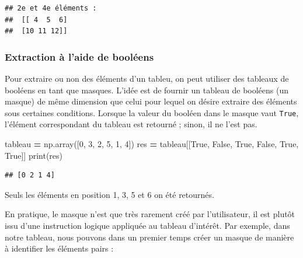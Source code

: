 \documentclass[12pt,]{book}
\newenvironment{Shaded}{\begin{snugshade}}{\end{snugshade}}
\newcommand{\DecValTok}[1]{\textcolor[rgb]{0.00,0.00,0.81}{#1}}
\newcommand{\VariableTok}[1]{\textcolor[rgb]{0.00,0.00,0.00}{#1}}
\newcommand{\OperatorTok}[1]{\textcolor[rgb]{0.81,0.36,0.00}{\textbf{#1}}}
\newcommand{\BuiltInTok}[1]{#1}
\newcommand{\NormalTok}[1]{#1}
\numberwithin{equation}{section}
\numberwithin{countremarque}{section}
\begin{document}
\begin{lstlisting}
## 2e et 4e éléments : 
##  [[ 4  5  6]
##  [10 11 12]]
\end{lstlisting}

\subsubsection{Extraction à l'aide de
booléens}\label{extraction-a-laide-de-booleens}

Pour extraire ou non des éléments d'un tableu, on peut utiliser des
tableaux de booléens en tant que masques. L'idée est de fournir un
tableau de booléens (un masque) de même dimension que celui pour lequel
on désire extraire des éléments sous certaines conditions. Lorsque la
valeur du booléen dans le masque vaut \texttt{True}, l'élément
correspondant du tableau est retourné ; sinon, il ne l'est pas.

\begin{Shaded}
\begin{Highlighting}[]
\NormalTok{tableau }\OperatorTok{=}\NormalTok{ np.array([}\DecValTok{0}\NormalTok{, }\DecValTok{3}\NormalTok{, }\DecValTok{2}\NormalTok{, }\DecValTok{5}\NormalTok{, }\DecValTok{1}\NormalTok{, }\DecValTok{4}\NormalTok{])}
\NormalTok{res }\OperatorTok{=}\NormalTok{ tableau[[}\VariableTok{True}\NormalTok{, }\VariableTok{False}\NormalTok{, }\VariableTok{True}\NormalTok{, }\VariableTok{False}\NormalTok{, }\VariableTok{True}\NormalTok{, }\VariableTok{True}\NormalTok{]]}
\BuiltInTok{print}\NormalTok{(res)}
\end{Highlighting}
\end{Shaded}

\begin{lstlisting}
## [0 2 1 4]
\end{lstlisting}

Seuls les éléments en position 1, 3, 5 et 6 on été retournés.

En pratique, le masque n'est que très rarement créé par l'utilisateur,
il est plutôt issu d'une instruction logique appliquée au tableau
d'intérêt. Par exemple, dans notre tableau, nous pouvons dans un premier
temps créer un masque de manière à identifier les éléments pairs :

\begin{Shaded}
\end{Shaded}
\end{document}
